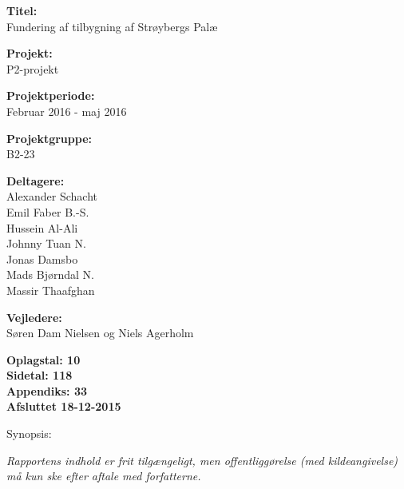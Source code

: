 \begin{minipage}[t]{0.48\textwidth}
\textbf{Titel:} \\[5pt]\hspace{2ex}
Fundering af tilbygning af Strøybergs Palæ \bigskip

\textbf{Projekt:} \\[5pt]\bigskip\hspace{2ex}
P2-projekt

\textbf{Projektperiode:} \\[5pt]\bigskip\hspace{2ex}
Februar 2016 - maj 2016

\textbf{Projektgruppe:} \\[5pt]\bigskip\hspace{2ex}
B2-23	

\textbf{Deltagere:} \\[5pt]\hspace*{2ex}
Alexander Schacht \\\hspace*{2ex}
Emil Faber B.-S. \\\hspace*{2ex}
Hussein Al-Ali \\\hspace*{2ex}
Johnny Tuan N. \\\hspace*{2ex}
Jonas Damsbo \\\hspace*{2ex}
Mads Bjørndal N.\\\bigskip\hspace*{2ex}
Massir Thaafghan

\textbf{Vejledere:} \\[5pt]\hspace*{2ex}
Søren Dam Nielsen og Niels Agerholm




\vspace*{1cm}

\textbf{Oplagstal: 10} \\
\textbf{Sidetal: 118 } \\
\textbf{Appendiks: 33 } \\ 
\textbf{Afsluttet 18-12-2015}

\end{minipage}
\hfill
\begin{minipage}[t]{0.483\textwidth}
Synopsis: \\[5pt]
\fbox{\parbox{7cm}{\bigskip\bigskip}}
\end{minipage}

\vfill

{\footnotesize\itshape Rapportens indhold er frit tilgængeligt, men offentliggørelse (med kildeangivelse) må kun ske efter aftale med forfatterne.}

